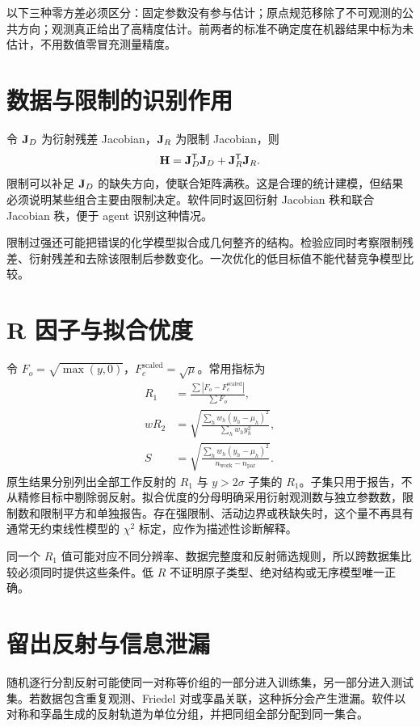 以下三种零方差必须区分：固定参数没有参与估计；原点规范移除了不可观测的公共方向；观测真正给出了高精度估计。前两者的标准不确定度在机器结果中标为未估计，不用数值零冒充测量精度。

\section{数据与限制的识别作用}
令 $\mathbf{J}_D$ 为衍射残差 Jacobian，$\mathbf{J}_R$ 为限制 Jacobian，则
\begin{equation}
\mathbf{H}=\mathbf{J}_D^{\mathsf T}\mathbf{J}_D+\mathbf{J}_R^{\mathsf T}\mathbf{J}_R.
\end{equation}
限制可以补足 $\mathbf{J}_D$ 的缺失方向，使联合矩阵满秩。这是合理的统计建模，但结果必须说明某些组合主要由限制决定。软件同时返回衍射 Jacobian 秩和联合 Jacobian 秩，便于 agent 识别这种情况。

限制过强还可能把错误的化学模型拟合成几何整齐的结构。检验应同时考察限制残差、衍射残差和去除该限制后参数变化。一次优化的低目标值不能代替竞争模型比较。

\section{R 因子与拟合优度}
令 $F_o=\sqrt{\max(y,0)}$，$F_c^{\mathrm{scaled}}=\sqrt{\mu}$。常用指标为
\begin{align}
R_1&=\frac{\sum\left|F_o-F_c^{\mathrm{scaled}}\right|}{\sum F_o},\\
wR_2&=\sqrt{\frac{\sum_hw_h(y_h-\mu_h)^2}{\sum_hw_hy_h^2}},\\
S&=\sqrt{\frac{\sum_hw_h(y_h-\mu_h)^2}{n_{\mathrm{work}}-n_{\mathrm{par}}}}.
\end{align}
原生结果分别列出全部工作反射的 $R_1$ 与 $y>2\sigma$ 子集的 $R_1$。子集只用于报告，不从精修目标中剔除弱反射。拟合优度的分母明确采用衍射观测数与独立参数数，限制数和限制平方和单独报告。存在强限制、活动边界或秩缺失时，这个量不再具有通常无约束线性模型的 $\chi^2$ 标定，应作为描述性诊断解释。

同一个 $R_1$ 值可能对应不同分辨率、数据完整度和反射筛选规则，所以跨数据集比较必须同时提供这些条件。低 $R$ 不证明原子类型、绝对结构或无序模型唯一正确。

\section{留出反射与信息泄漏}
随机逐行分割反射可能使同一对称等价组的一部分进入训练集，另一部分进入测试集。若数据包含重复观测、Friedel 对或孪晶关联，这种拆分会产生泄漏。软件以对称和孪晶生成的反射轨道为单位分组，并把同组全部分配到同一集合。

